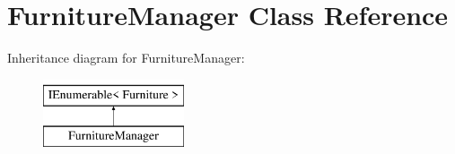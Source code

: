 \hypertarget{class_furniture_manager}{}\section{Furniture\+Manager Class Reference}
\label{class_furniture_manager}
Inheritance diagram for Furniture\+Manager\+:\begin{figure}[H]
\begin{center}
\leavevmode
\includegraphics[height=2.000000cm]{class_furniture_manager}
\end{center}
\end{figure}
